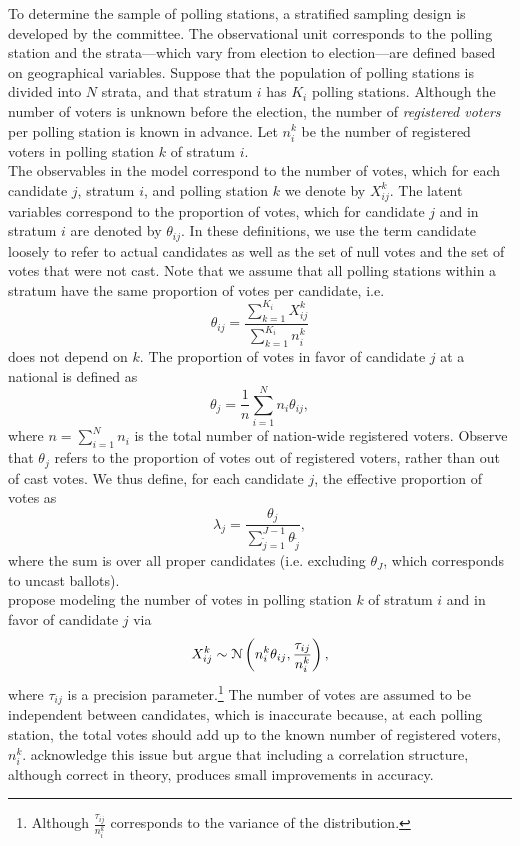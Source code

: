 \documentclass{article}
\begin{document}
To determine the sample of polling stations, a stratified sampling design is developed by the committee. The observational unit corresponds to the polling station and the strata---which vary from election to election---are defined based on geographical variables. Suppose that the population of polling stations is divided into $N$ strata, and that stratum $i$ has $K_i$ polling stations. Although the number of voters is unknown before the election, the number of \textit{registered voters} per polling station is known in advance. Let $n_i^k$ be the number of registered voters in polling station $k$ of stratum $i$. \\

The observables in the model correspond to the number of votes, which for each candidate $j$, stratum $i$, and polling station $k$ we denote by $X_{ij}^k$. The latent variables correspond to the proportion of votes, which for candidate $j$ and in stratum $i$ are denoted by $\theta_{ij}$. In these definitions, we use the term candidate loosely to refer to actual candidates as well as the set of null votes and the set of votes that were not cast. Note that we assume that all polling stations within a stratum have the same proportion of votes per candidate, i.e.
\[
\theta_{ij} = \frac{\sum_{k=1}^{K_i} X_{ij}^k}{\sum_{k=1}^{K_i} n_{i}^k}
\]
does not depend on $k$. The proportion of votes in favor of candidate $j$ at a national is defined as
\[
  \theta_j = \frac{1}{n} \sum_{i=1}^N n_i \theta_{ij}, \label{eq:thetaj}
\]
where $n = \sum_{i=1}^N n_i$ is the total number of nation-wide registered voters. Observe that $\theta_j$ refers to the proportion of votes out of registered voters, rather than out of cast votes. We thus define, for each candidate $j$, the effective proportion of votes as
\[
  \lambda_j = \frac{\theta_j}{\sum_{\tilde{j} = 1}^{J-1} \theta_{\tilde{j}}},  \label{eq:lambdaj}
\]
where the sum is over all proper candidates (i.e. excluding $\theta_J$, which corresponds to uncast ballots). \\



\citet{mendoza-nieto2016} propose modeling the number of votes in polling station $k$ of stratum $i$ and in favor of candidate $j$ via
\[
  X_{ij}^k \sim \mathcal{N} \left( n_i^k \theta_{ij}, \frac{\tau_{ij}}{n_i^k} \right), \label{eq:original_likelihood}
\]
where $\tau_{ij}$ is a precision parameter.\footnote{Although $\frac{\tau_{ij}}{n_i^k}$ corresponds to the variance of the distribution.} The number of votes are assumed to be independent between candidates, which is inaccurate because, at each polling station, the total votes should add up to the known number of registered voters, $n_i^k$. \citet{mendoza-nieto2016} acknowledge this issue but argue that including a correlation structure, although correct in theory, produces small improvements in accuracy. \\
\end{document}
